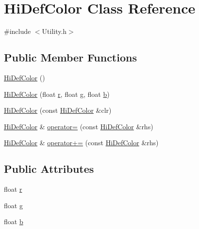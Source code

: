 \hypertarget{class_hi_def_color}{\section{Hi\-Def\-Color Class Reference}
\label{class_hi_def_color}
}


{\ttfamily \#include $<$Utility.\-h$>$}

\subsection*{Public Member Functions}
\begin{DoxyCompactItemize}
\item 
\hyperlink{class_hi_def_color_a36ec3082115008dfa06a3f5e76b679cf}{Hi\-Def\-Color} ()
\item 
\hyperlink{class_hi_def_color_a488b3cda33c527688e860e23719ad14b}{Hi\-Def\-Color} (float \hyperlink{class_hi_def_color_ab04783d755f14245ce7482aa68e5bbd7}{r}, float \hyperlink{class_hi_def_color_a63606164cca043b989cc904f6dfd1b12}{g}, float \hyperlink{class_hi_def_color_a783305313073eed854522db82459c185}{b})
\item 
\hyperlink{class_hi_def_color_a50b7fe57efaf975deaccba71057b4dee}{Hi\-Def\-Color} (const \hyperlink{class_hi_def_color}{Hi\-Def\-Color} \&clr)
\item 
\hyperlink{class_hi_def_color}{Hi\-Def\-Color} \& \hyperlink{class_hi_def_color_aa4c1ef6d9e3338962f8e68d3086ecde0}{operator=} (const \hyperlink{class_hi_def_color}{Hi\-Def\-Color} \&rhs)
\item 
\hyperlink{class_hi_def_color}{Hi\-Def\-Color} \& \hyperlink{class_hi_def_color_a80daa3de1eb6c526074a0401509aae12}{operator+=} (const \hyperlink{class_hi_def_color}{Hi\-Def\-Color} \&rhs)
\end{DoxyCompactItemize}
\subsection*{Public Attributes}
\begin{DoxyCompactItemize}
\item 
float \hyperlink{class_hi_def_color_ab04783d755f14245ce7482aa68e5bbd7}{r}
\item 
float \hyperlink{class_hi_def_color_a63606164cca043b989cc904f6dfd1b12}{g}
\item 
float \hyperlink{class_hi_def_color_a783305313073eed854522db82459c185}{b}
\end{DoxyCompactItemize}
